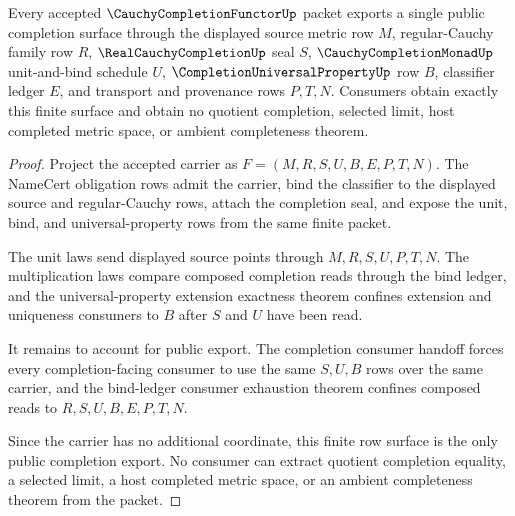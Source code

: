 \begin{theorem}
\label{thm:cauchycompletionfunctor-public-completion-export}
Every accepted $\CauchyCompletionFunctorUp$ packet exports a single public completion surface through the displayed source metric row $M$, regular-Cauchy family row $R$, $\RealCauchyCompletionUp$ seal $S$, $\CauchyCompletionMonadUp$ unit-and-bind schedule $U$, $\CompletionUniversalPropertyUp$ row $B$, classifier ledger $E$, and transport and provenance rows $P,T,N$. Consumers obtain exactly this finite surface and obtain no quotient completion, selected limit, host completed metric space, or ambient completeness theorem.
\end{theorem}
\begin{proof}
Project the accepted carrier as $F=(M,R,S,U,B,E,P,T,N)$. The NameCert obligation rows admit the carrier, bind the classifier to the displayed source and regular-Cauchy rows, attach the completion seal, and expose the unit, bind, and universal-property rows from the same finite packet.

The unit laws send displayed source points through $M,R,S,U,P,T,N$. The multiplication laws compare composed completion reads through the bind ledger, and the universal-property extension exactness theorem confines extension and uniqueness consumers to $B$ after $S$ and $U$ have been read.

It remains to account for public export. The completion consumer handoff forces every completion-facing consumer to use the same $S,U,B$ rows over the same carrier, and the bind-ledger consumer exhaustion theorem confines composed reads to $R,S,U,B,E,P,T,N$.

Since the carrier has no additional coordinate, this finite row surface is the only public completion export. No consumer can extract quotient completion equality, a selected limit, a host completed metric space, or an ambient completeness theorem from the packet.
\end{proof}

